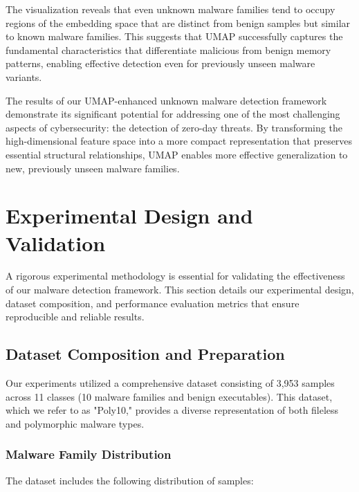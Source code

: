 The visualization reveals that even unknown malware families tend to occupy regions of the embedding space that are distinct from benign samples but similar to known malware families. This suggests that UMAP successfully captures the fundamental characteristics that differentiate malicious from benign memory patterns, enabling effective detection even for previously unseen malware variants.

The results of our UMAP-enhanced unknown malware detection framework demonstrate its significant potential for addressing one of the most challenging aspects of cybersecurity: the detection of zero-day threats. By transforming the high-dimensional feature space into a more compact representation that preserves essential structural relationships, UMAP enables more effective generalization to new, previously unseen malware families.

\section{Experimental Design and Validation}
\label{sec:experimental-design}

A rigorous experimental methodology is essential for validating the effectiveness of our malware detection framework. This section details our experimental design, dataset composition, and performance evaluation metrics that ensure reproducible and reliable results.

\subsection{Dataset Composition and Preparation}
\label{subsec:dataset-composition}

Our experiments utilized a comprehensive dataset consisting of 3,953 samples across 11 classes (10 malware families and benign executables). This dataset, which we refer to as "Poly10," provides a diverse representation of both fileless and polymorphic malware types.

\subsubsection{Malware Family Distribution}

The dataset includes the following distribution of samples:

